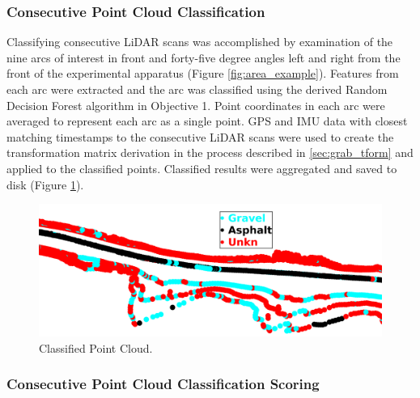 \documentclass[numbered,pdftex]{ohio-etd}
\begin{document}
{{{{			\subsubsection{Consecutive Point Cloud Classification}\label{sec:consecutive_point_cloud_classification}{
			
				{Classifying consecutive LiDAR scans was accomplished by examination of the nine arcs of interest in front and forty-five degree angles left and right from the front of the experimental apparatus (Figure \ref{fig:area_example}). Features from each arc were extracted and the arc was classified using the derived Random Decision Forest algorithm in Objective 1. Point coordinates in each arc were averaged to represent each arc as a single point. GPS and IMU data with closest matching timestamps to the consecutive LiDAR scans were used to create the transformation matrix derivation in the process described in \ref{sec:grab_tform} and applied to the classified points. Classified results were aggregated and saved to disk (Figure \ref{fig:raw_classification_results}).}
				
				\begin{figure}[H]
					\centering
					\includegraphics[width=0.9\linewidth]{Defense_Images/classified_point_cloud_example_redux}
					\caption[Classified Point Cloud]{Classified Point Cloud.}
					\label{fig:raw_classification_results}
				\end{figure}
				
			}
			
			\subsubsection{Consecutive Point Cloud Classification Scoring}\label{sec:consecutive_point_cloud_classification_scoring}{
				
}}}}}
\end{document}

